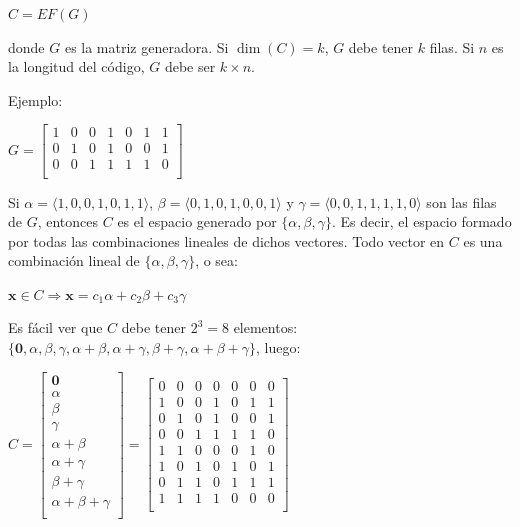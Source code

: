 \documentclass[10pt,a4paper]{article}
\begin{document}
\begin{center}
$C = EF(G)$
\end{center}

donde $G$ es la matriz generadora. Si $\dim(C) = k$, $G$ debe tener $k$ filas. Si $n$ es la longitud del código, $G$ debe ser $k\times n$.

Ejemplo:

\begin{center}
$G = \left[ \begin{array}{ccccccc} 1 & 0 & 0 & 1 & 0 & 1 & 1\\ 0 & 1 & 0 & 1 & 0 & 0 & 1\\ 0 & 0 & 1 & 1 & 1 & 1 & 0\\ \end{array} \right]$
\end{center}

Si $\alpha = \langle 1, 0, 0 ,1,0,1,1\rangle$, $\beta = \langle 0,1,0,1,0,0,1\rangle$ y $\gamma = \langle 0,0,1,1,1,1,0\rangle$ son las filas de $G$, entonces $C$ es el espacio generado por $\{\alpha, \beta, \gamma\}$. Es decir, el espacio formado por todas las combinaciones lineales de dichos vectores. Todo vector en $C$ es una combinación lineal de $\{\alpha, \beta, \gamma\}$, o sea:

\begin{center}
$\textbf{x} \in C \Rightarrow \textbf{x} = c_1\alpha + c_2 \beta + c_3\gamma$
\end{center}

Es fácil ver que $C$ debe tener $2^3 = 8$ elementos: $\{\textbf{0}, \alpha, \beta, \gamma, \alpha + \beta, \alpha + \gamma, \beta +\gamma, \alpha + \beta + \gamma\}$, luego:

\begin{center}
$C = \left[ \begin{array}{c} \textbf{0}\\ \alpha\\ \beta\\ \gamma\\ \alpha + \beta \\ \alpha + \gamma\\ \beta + \gamma\\ \alpha + \beta + \gamma\\ \end{array} \right] = \left[ \begin{array}{cccccccc} 0&0&0&0&0&0&0\\ 1&0&0&1&0&1&1\\ 0&1&0&1&0&0&1\\ 0&0&1&1&1&1&0\\ 1&1&0&0&0&1&0\\ 1&0&1&0&1&0&1\\ 0&1&1&0&1&1&1\\ 1&1&1&1&0&0&0\\ \end{array} \right]$
\end{center}
\end{document}

